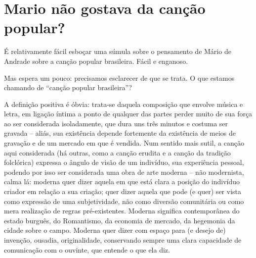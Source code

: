\begin{comment}
{\textbf{\emph{Dicionário musical
brasileiro:}}}

\begin{itemize}
\item
  \begin{quote}
  Canção
  \end{quote}
\item
  \begin{quote}
  Lundu
  \end{quote}
\item
  \begin{quote}
  Marcha
  \end{quote}
\item
  \begin{quote}
  Maxixe
  \end{quote}
\item
  \begin{quote}
  Modinha
  \end{quote}
\end{itemize}

{\textbf{\emph{Bibliografia}}}
\end{comment}



\chapter{Mario não gostava da canção popular?}

É relativamente fácil esboçar uma súmula sobre o pensamento de Mário de
Andrade sobre a canção popular brasileira. Fácil e enganoso.

Mas espera um pouco: precisamos esclarecer de que se trata. O que
estamos chamando de ``canção popular brasileira''?

A definição positiva é óbvia: trata-se daquela composição que envolve
música e letra, em ligação íntima a ponto de qualquer das partes perder
muito de sua força ao ser considerada isoladamente, que dura uns três
minutos e costuma ser gravada -- aliás, sua existência depende
fortemente da existência de meios de gravação e de um mercado em que é
vendida. Num sentido mais sutil, a canção aqui considerada (há outras,
como a canção erudita e a canção da tradição folclórica) expressa o
ângulo de visão de um indivíduo, sua experiência pessoal, podendo por
isso ser considerada uma obra de arte moderna -- não modernista, calma
lá: moderna quer dizer aquela em que está clara a posição do indivíduo
criador em relação a sua criação; quer dizer aquela que pode (e quer)
ser vista como expressão de uma subjetividade, não como diversão
comunitária ou como mera realização de regras pré-existentes. Moderna
significa contemporânea do estado burguês, do Romantismo, da economia de
mercado, da hegemonia da cidade sobre o campo. Moderna quer dizer com
espaço para (e desejo de) invenção, ousadia, originalidade, conservando
sempre uma clara capacidade de comunicação com o ouvinte, que entende o
que ela diz.

